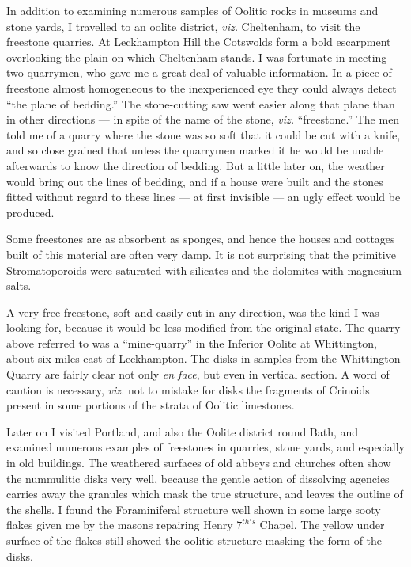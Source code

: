 \documentclass[a4paper, 12pt, oneside]{article}
\begin{document}
In addition to examining numerous samples of Oolitic rocks in museums and stone yards, I travelled to an oolite district, \emph{viz.} Cheltenham, to visit the freestone quarries. At Leckhampton Hill the Cotswolds form a bold escarpment overlooking the plain on which Cheltenham stands. I was fortunate in meeting two quarrymen, who gave me a great deal of valuable information. In a piece of freestone almost homogeneous to the inexperienced eye they could always detect ``the plane of bedding.'' The stone-cutting saw went easier along that plane than in other directions --- in spite of the name of the stone, \emph{viz.} ``freestone.'' The men told me of a quarry where the stone was so soft that it could be cut with a knife, and so close grained that unless the quarrymen marked it he would be unable afterwards to know the direction of bedding. But a little later on, the weather would bring out the lines of bedding, and if a house were built and the stones fitted without regard to these lines --- at first invisible --- an ugly effect would be produced.

Some freestones are as absorbent as sponges, and hence the houses and cottages built of this material are often very damp. It is not surprising that the primitive Stromatoporoids were saturated with silicates and the dolomites with magnesium salts.

A very free freestone, soft and easily cut in any direction, was the kind I was looking for, because it would be less modified from the original state. The quarry above referred to was a ``mine-quarry'' in the Inferior Oolite at Whittington, about six miles east of Leckhampton. The disks in samples from the Whittington Quarry are fairly clear not only \emph{en face}, but even in vertical section. A word of caution is necessary, \emph{viz.} not to mistake for disks the fragments of Crinoids present in some portions of the strata of Oolitic limestones.

Later on I visited Portland, and also the Oolite district round Bath, and examined numerous examples of freestones in quarries, stone yards, and especially in old buildings. The weathered surfaces of old abbeys and churches often show the nummulitic disks very well, because the gentle action of dissolving agencies carries away the granules which mask the true structure, and leaves the outline of the shells. I found the Foraminiferal structure well shown in some large sooty flakes given me by the masons repairing Henry $7^{th's}$ Chapel. The yellow under surface of the flakes still showed the oolitic structure masking the form of the disks.
\end{document}
